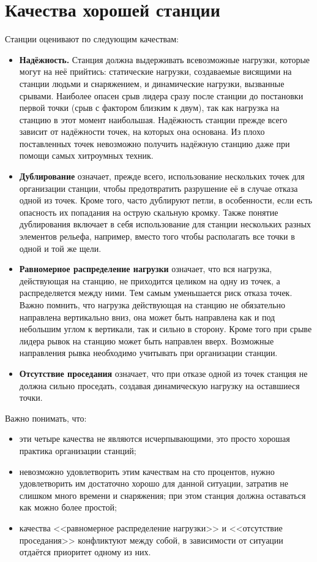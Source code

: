 \documentclass[fleqn, 12pt]{extarticle}
\begin{document}
\section{Качества хорошей станции}
    Станции оценивают по следующим качествам:
    \begin{itemize}
        \item \textbf{Надёжность.} Станция должна выдерживать всевозможные нагрузки, которые могут на неё прийтись: статические нагрузки, создаваемые висящими на станции людьми
                и снаряжением, и динамические нагрузки, вызванные срывами. Наиболее опасен срыв лидера сразу после станции до постановки первой точки (срыв с фактором близким к двум),
                так как нагрузка на станцию в этот момент наибольшая. Надёжность станции прежде всего зависит от надёжности точек, на которых она основана. 
                Из плохо поставленных точек невозможно получить надёжную станцию даже при помощи самых хитроумных техник.
        \item \textbf{Дублирование} означает, прежде всего, использование нескольких точек для организации станции, чтобы предотвратить разрушение её в случае отказа одной из точек. 
                Кроме того, часто дублируют петли, в особенности, если есть опасность их попадания на острую скальную кромку. Также понятие дублирования включает в себя использование 
                для станции нескольких разных элементов рельефа, например, вместо того чтобы располагать все точки в одной и той же щели.
        \item \textbf{Равномерное распределение нагрузки} означает, что вся нагрузка, действующая на станцию, не приходится целиком на одну из точек, а распределяется между ними. 
                Тем самым уменьшается риск отказа точек. Важно помнить, что нагрузка действующая на станцию не обязательно направлена вертикально вниз, она может быть направлена как 
                и под небольшим углом к вертикали, так и сильно в сторону. Кроме того при срыве лидера рывок на станцию может быть направлен вверх. Возможные направления рывка 
                необходимо учитывать при организации станции.
        \item \textbf{Отсутствие проседания} означает, что при отказе одной из точек станция не должна сильно проседать, создавая динамическую нагрузку на оставшиеся точки.
    \end{itemize}
    
    Важно понимать, что:
    \begin{itemize}
        \item эти четыре качества не являются исчерпывающими, это просто хорошая практика организации станций;
        \item невозможно удовлетворить этим качествам на сто процентов, нужно удовлетворить им достаточно хорошо для данной ситуации, затратив не слишком много времени и снаряжения; 
              при этом станция должна оставаться как можно более простой;
        \item качества <<равномерное распределение нагрузки>> и <<отсутствие проседания>> конфликтуют между собой, в зависимости от ситуации отдаётся приоритет одному из них.
    \end{itemize}
\end{document}
